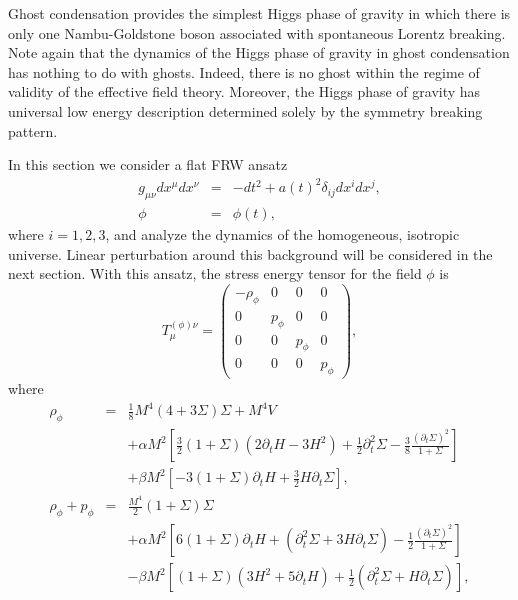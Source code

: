 Ghost condensation provides the simplest Higgs phase of gravity in which
there is only one Nambu-Goldstone boson associated with spontaneous
Lorentz breaking. Note again that the dynamics of the Higgs phase of
gravity in ghost condensation has nothing to do with ghosts. Indeed, 
there is no ghost within the regime of validity of the effective field
theory. Moreover, the Higgs phase of gravity has universal low energy
description determined solely by the symmetry breaking pattern. 


In this section we consider a flat FRW ansatz 
%
\begin{eqnarray}
 g_{\mu\nu}dx^{\mu}dx^{\nu} & = & -dt^2 + a(t)^2\delta_{ij}dx^idx^j,
  \nonumber\\
 \phi & = & \phi(t),
\end{eqnarray}
where $i=1,2,3$, and analyze the dynamics of the homogeneous, isotropic
universe. Linear perturbation around this background will be considered
in the next section. With this ansatz, the stress energy tensor for the
field $\phi$ is 
%
\begin{equation}
 T^{(\phi)\nu}_{\mu} = \left(\begin{array}{cccc} 
        -\rho_{\phi} & 0 & 0 & 0 \\
        0 & p_{\phi} & 0 & 0 \\
        0 & 0 & p_{\phi} & 0 \\
        0 & 0 & 0 & p_{\phi}
        \end{array}\right),
\end{equation}
where
%
\begin{eqnarray}
 \rho_{\phi} & = & \frac{1}{8}M^4(4+3\Sigma)\Sigma + M^4V \nonumber\\
& &  + \alpha M^2 
  \left[ \frac{3}{2}(1+\Sigma)(2\partial_tH-3H^2)
   + \frac{1}{2}\partial_t^2\Sigma
   - \frac{3}{8}\frac{(\partial_t\Sigma)^2}{1+\Sigma}
  \right] \nonumber\\
 & & +\beta M^2
  \left[ -3(1+\Sigma)\partial_tH+\frac{3}{2}H\partial_t\Sigma
  \right],\nonumber\\
 \rho_{\phi} + p_{\phi} & = & 
  \frac{M^4}{2}(1+\Sigma)\Sigma \nonumber\\
 & &  + \alpha M^2 
  \left[ 6(1+\Sigma)\partial_tH+(\partial_t^2\Sigma+3H\partial_t\Sigma)
   -\frac{1}{2}\frac{(\partial_t\Sigma)^2}{1+\Sigma}\right] \nonumber\\
 & &   - \beta M^2
  \left[ (1+\Sigma)(3H^2+5\partial_tH)
   + \frac{1}{2}(\partial_t^2\Sigma+H\partial_t\Sigma)
  \right],
  \label{eqn:rho-p-phi}
\end{eqnarray}
